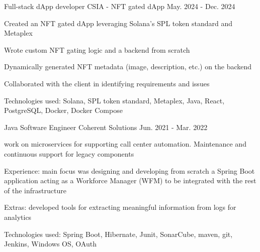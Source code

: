 \begin{cventries}
  \cventry
  {Full-stack dApp developer} %
  {CSIA - NFT gated dApp} %
  {} %
  {May. 2024 - Dec. 2024} %
  {
    \begin{cvitems} %
      \item {Created an NFT gated dApp leveraging Solana's SPL token standard and Metaplex}
      \item {Wrote custom NFT gating logic and a backend from scratch}
      \item {Dynamically generated NFT metadata (image, description, etc.) on the backend}
      \item {Collaborated with the client in identifying requirements and issues}
      \item {Technologies used: Solana, SPL token standard, Metaplex, Java, React, PostgreSQL, Docker, Docker Compose}
    \end{cvitems}
  }

\cventry
    {Java Software Engineer} %
    {Coherent Solutions} %
    {} %
    {Jun. 2021 - Mar. 2022} %
    {
      \begin{cvitems} %
        \item {work on microservices for supporting call center automation. Maintenance and continuous support for legacy components}
        \item {Experience: main focus was designing and developing from scratch a Spring Boot application acting as a Workforce Manager (WFM) to be integrated with the rest of the infrastructure}
        \item {Extras: developed tools for extracting meaningful information from logs for analytics}
        \item {Technologies used: Spring Boot, Hibernate, Junit, SonarCube, maven, git, Jenkins, Windows OS, OAuth}
      \end{cvitems}
    }


\end{cventries}
